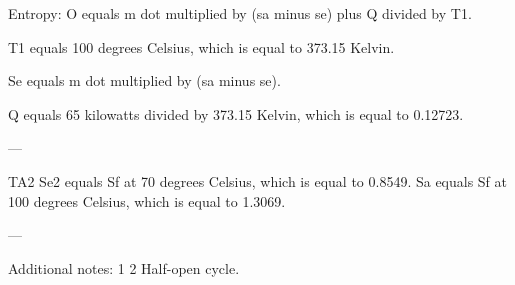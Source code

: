 Entropy:  
O equals m dot multiplied by (sa minus se) plus Q divided by T1.  

T1 equals 100 degrees Celsius, which is equal to 373.15 Kelvin.  

Se equals m dot multiplied by (sa minus se).  

Q equals 65 kilowatts divided by 373.15 Kelvin, which is equal to 0.12723.  

---

TA2  
Se2 equals Sf at 70 degrees Celsius, which is equal to 0.8549.  
Sa equals Sf at 100 degrees Celsius, which is equal to 1.3069.  

---

Additional notes:  
1  
2  
Half-open cycle.